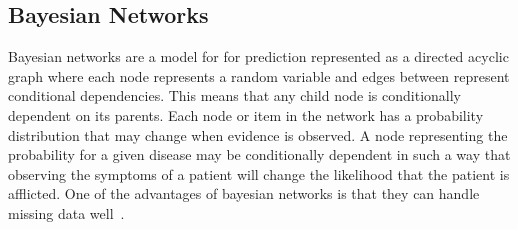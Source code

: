\subsection{Bayesian Networks}
\label{sec:analysis:recommender-methods:bayesian-networks}

Bayesian networks are a model for for prediction represented as a directed acyclic graph where each node represents a random variable and edges between represent conditional dependencies.
This means that any child node is conditionally dependent on its parents.
Each node or item in the network has a probability distribution that may change when evidence is observed.
A node representing the probability for a given disease may be conditionally dependent in such a way that observing the symptoms of a patient will change the likelihood that the patient is afflicted.
One of the advantages of bayesian networks is that they can handle missing data well~\cite{heckerman2008tutorial}.

